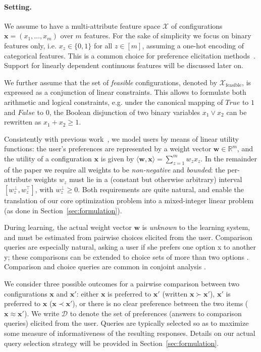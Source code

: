 \documentclass{article}
\renewcommand\[{\begin{equation}}
\renewcommand\]{\end{equation}}
\newcommand{\bbR}{\mathbb{R}}
\newcommand{\calvar}[1]{\ensuremath{\mathcal{#1}}}
\newcommand{\calD}{\calvar{D}}
\newcommand{\calX}{\calvar{X}}
\newcommand{\vecvar}[1]{\ensuremath{\boldsymbol{#1}}}
\newcommand{\vw}{\vecvar{w}}
\newcommand{\vx}{\vecvar{x}}
\newcommand{\andrea}[1]{{\bf \textcolor{blue}{{\fbox{Andrea:} #1}}}}
\begin{document}
\paragraph{Setting.} We assume to have a multi-attribute feature space
$\calX$ of configurations $\vx = (x_1, \ldots, x_m)$ over $m$
features. For the sake of simplicity we focus on binary features only,
i.e. $x_z\in\{0,1\}$ for all $z\in[m]$, assuming a one-hot encoding of
categorical features. This is a common choice for preference
elicitation methods~\cite{guo2010real,viappiani2010optimal}. Support
for linearly dependent continuous features will be discussed later on.

We further assume that the set of {\em feasible} configurations, denoted by
$\calX_\text{feasible}$, is expressed as
a conjunction of linear constraints. This allows to formulate both arithmetic
and logical constraints,
e.g. under the canonical mapping of $True$ to $1$ and $False$ to $0$, the
Boolean disjunction of two binary variables $x_1 \lor x_2$ can be rewritten as
$x_1 + x_2 \ge 1$.

Consistently with previous work~\cite{guo2010real,viappiani2010optimal}, we model users by means
of linear utility functions: the user's preferences are represented by a weight
vector $\vw\in\bbR^m$, and the utility of a configuration $\vx$ is given by
$\langle \vw, \vx \rangle = \sum_{z=1}^m w_z x_z$. In the remainder of the paper we
require all weights to be {\em non-negative} and {\em bounded}: the per-attribute
weights $w_z$ must lie in a (constant but otherwise arbitrary) interval
$[w^\bot_z, w^\top_z]$, with $w^\bot_z \ge 0$. Both requirements are quite
natural, and enable the translation of our core optimization problem into a
mixed-integer linear problem (as done in Section~\ref{sec:formulation}).

During learning, the actual weight vector $\vw$ is {\em unknown} to the
learning system, and must be estimated from pairwise choices elicited from the
user.
Comparison queries are especially natural, asking a user if she prefers one option x to another y;
these comparisons can be extended to choice sets of more than two options \cite{viappiani2009,viappiani2010optimal}.
Comparison and choice queries are common in conjoint analysis \cite{louviere2000,toubia2004}.


We consider three possible outcomes for a pairwise comparison between
two configurations $\vx$ and $\vx'$: either $\vx$ is preferred to $\vx'$ (written
$\vx \succ \vx'$), $\vx'$ is preferred to $\vx$ ($\vx \prec \vx'$), or there is
no clear preference between the two items ($\vx \approx \vx'$). We write
$\calD$ to denote the set of preferences (answers to comparison queries) 
elicited from the user. Queries are typically selected so as to maximize 
some measure of informativeness of the
resulting responses.  Details on our actual query selection strategy will be
provided in Section~\ref{sec:formulation}.
\end{document}
